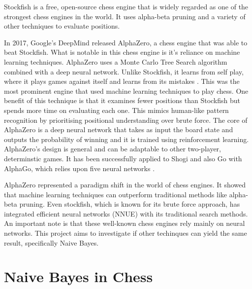 Stockfish is a free, open-source chess engine that is widely regarded as one of the strongest chess engines in the world. It uses alpha-beta pruning and a variety of other techniques to evaluate positions. 

In 2017, Google's DeepMind released AlphaZero, a chess engine that was able to beat Stockfish. What is notable in this chess engine is it's reliance on machine learning techniques. AlphaZero uses a Monte Carlo Tree Search algorithm combined with a deep neural network. Unlike Stockfish, it learns from self play, where it plays games against itself and learns from its mistakes \cite{kleinNeuralNetworksChess2022}. This was the most prominent engine that used machine learning techniques to play chess. One benefit of this technique is that it examines fewer positions than Stockfish but spends more time on evaluating each one. This mimics human-like pattern recognition by prioritising positional understanding over brute force. The core of AlphaZero is a deep neural network that takes as input the board state and outputs the probability of winning and it is trained using reinforcement learning. AlphaZero's design is general and can be adaptable to other two-player, determinstic games. It has been successfully applied to Shogi and also Go with AlphaGo, which relies upon five neural networks \cite{kleinNeuralNetworksChess2022}.

AlphaZero represented a paradigm shift in the world of chess engines. It showed that machine learning techniques can outperform traditional methods like alpha-beta pruning. Even stockfish, which is known for its brute force approach, has integrated efficient neural networks (NNUE) with its traditional search methods. An important note is that these well-known chess engines rely mainly on neural networks. This project aims to investigate if other techinques can yield the same result, specifically Naive Bayes. 


\section{Naive Bayes in Chess}

